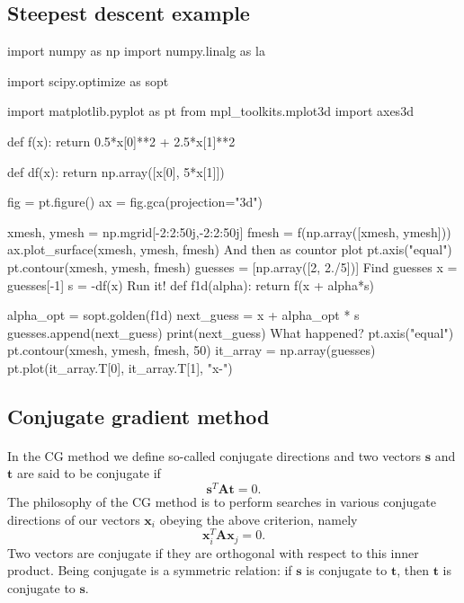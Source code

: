 \documentclass[%
oneside,                 %
final,                   %
10pt]{article}
\begin{document}
\subsection{Steepest descent example}

\bpycod
import numpy as np
import numpy.linalg as la

import scipy.optimize as sopt

import matplotlib.pyplot as pt
from mpl_toolkits.mplot3d import axes3d

def f(x):
    return 0.5*x[0]**2 + 2.5*x[1]**2

def df(x):
    return np.array([x[0], 5*x[1]])

fig = pt.figure()
ax = fig.gca(projection="3d")

xmesh, ymesh = np.mgrid[-2:2:50j,-2:2:50j]
fmesh = f(np.array([xmesh, ymesh]))
ax.plot_surface(xmesh, ymesh, fmesh)
\epycod
And then as countor plot
\bpycod
pt.axis("equal")
pt.contour(xmesh, ymesh, fmesh)
guesses = [np.array([2, 2./5])]
\epycod
Find guesses
\bpycod
x = guesses[-1]
s = -df(x)
\epycod
Run it!
\bpycod
def f1d(alpha):
    return f(x + alpha*s)

alpha_opt = sopt.golden(f1d)
next_guess = x + alpha_opt * s
guesses.append(next_guess)
print(next_guess)
\epycod
What happened?
\bpycod
pt.axis("equal")
pt.contour(xmesh, ymesh, fmesh, 50)
it_array = np.array(guesses)
pt.plot(it_array.T[0], it_array.T[1], "x-")
\epycod

\subsection{Conjugate gradient method}

\paragraph{}
In the CG method we define so-called conjugate directions and two vectors 
$\bm{s}$ and $\bm{t}$
are said to be
conjugate if
\begin{equation*}
\bm{s}^T\bm{A}\bm{t}= 0.
\end{equation*}
The philosophy of the CG method is to perform searches in various conjugate directions
of our vectors $\bm{x}_i$ obeying the above criterion, namely
\begin{equation*}
\bm{x}_i^T\bm{A}\bm{x}_j= 0.
\end{equation*}
Two vectors are conjugate if they are orthogonal with respect to 
this inner product. Being conjugate is a symmetric relation: if $\bm{s}$ is conjugate to $\bm{t}$, then $\bm{t}$ is conjugate to $\bm{s}$.
\end{document}
